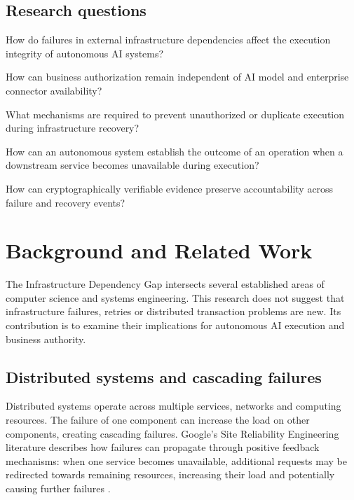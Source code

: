 \documentclass[11pt,a4paper]{article}
\begin{document}
\subsection{Research questions}

\begin{description}[leftmargin=3.2em,style=nextline]
  \item[RQ1] How do failures in external infrastructure dependencies affect the execution integrity of autonomous AI systems?
  \item[RQ2] How can business authorization remain independent of AI model and enterprise connector availability?
  \item[RQ3] What mechanisms are required to prevent unauthorized or duplicate execution during infrastructure recovery?
  \item[RQ4] How can an autonomous system establish the outcome of an operation when a downstream service becomes unavailable during execution?
  \item[RQ5] How can cryptographically verifiable evidence preserve accountability across failure and recovery events?
\end{description}

\section{Background and Related Work}

The Infrastructure Dependency Gap intersects several established areas of computer science and systems engineering. This research does not suggest that infrastructure failures, retries or distributed transaction problems are new. Its contribution is to examine their implications for autonomous AI execution and business authority.

\subsection{Distributed systems and cascading failures}

Distributed systems operate across multiple services, networks and computing resources. The failure of one component can increase the load on other components, creating cascading failures. Google's Site Reliability Engineering literature describes how failures can propagate through positive feedback mechanisms: when one service becomes unavailable, additional requests may be redirected towards remaining resources, increasing their load and potentially causing further failures \cite{sre}.
\end{document}
